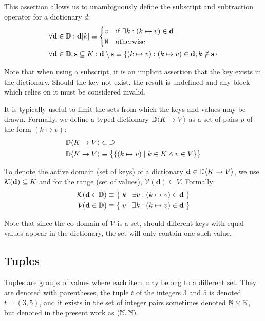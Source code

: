 This assertion allows us to unambiguously define the subscript and subtraction operator for a dictionary $d$:
\begin{align}
  \forall \mathbf{d} \in \mathbb{D}&: \mathbf{d}[k] \equiv \begin{cases}
    v & \text{if}\ \exists k : (k \mapsto v) \in \mathbf{d} \\
    \emptyset & \text{otherwise}
  \end{cases}\\
  \forall \mathbf{d} \in \mathbb{D}&, \mathbf{s} \subseteq K: \mathbf{d} \setminus \mathbf{s} \equiv \{ (k \mapsto v): (k \mapsto v) \in \mathbf{d}, k \not \in \mathbf{s} \}
\end{align}

Note that when using a subscript, it is an implicit assertion that the key exists in the dictionary. Should the key not exist, the result is undefined and any block which relies on it must be considered invalid.

It is typically useful to limit the sets from which the keys and values may be drawn. Formally, we define a typed dictionary $\mathbb{D}\langle K\to V\rangle$ as a set of pairs $p$ of the form $(k \mapsto v)$:
\begin{align}
  \mathbb{D}\langle K\to V\rangle &\subset \mathbb{D} \\
  \mathbb{D}\langle K\to V\rangle &\equiv \big \{ \{ (k \mapsto v) \mid k \in K \wedge v \in V \} \big \}
\end{align}

To denote the active domain (\ie set of keys) of a dictionary $\mathbf{d} \in \mathbb{D}\langle K\to V\rangle$, we use $\mathcal{K}(\mathbf{d}) \subseteq K$ and for the range (\ie set of values), $\mathcal{V}(\mathbf{d}) \subseteq V$. Formally:
\begin{align}
  \mathcal{K}(\mathbf{d} \in \mathbb{D}) &\equiv \{\ k \mid \exists v : (k \mapsto v) \in \mathbf{d}\ \} \\
  \mathcal{V}(\mathbf{d} \in \mathbb{D}) &\equiv \{\ v \mid \exists k : (k \mapsto v) \in \mathbf{d}\ \}
\end{align}

Note that since the co-domain of $\mathcal{V}$ is a set, should different keys with equal values appear in the dictionary, the set will only contain one such value.

\subsection{Tuples}\label{sec:tuples}

Tuples are groups of values where each item may belong to a different set. They are denoted with parentheses, \eg the tuple $t$ of the integers $3$ and $5$ is denoted $t = (3, 5)$, and it exists in the set of integer pairs sometimes denoted $\mathbb{N} \times \mathbb{N}$, but denoted in the present work as $(\mathbb{N}, \mathbb{N})$.

